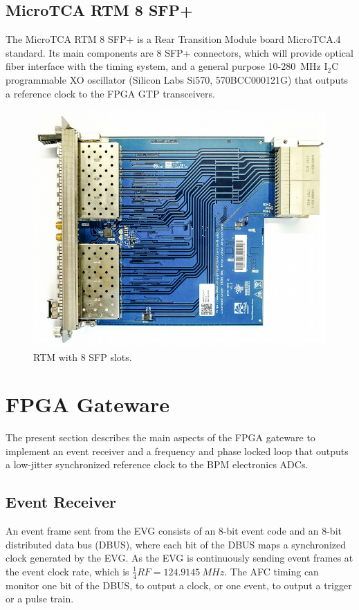 \documentclass[a4paper,
               biblatex,      %
               ]{jacow}
\begin{document}
\subsection{MicroTCA RTM 8 SFP+}
The MicroTCA RTM 8 SFP+ \cite{rtm-sfp-git} is a Rear Transition Module board MicroTCA.4 standard. Its main components are 8 SFP+ connectors, which will provide optical fiber interface with the timing system, and a general purpose 10-280~MHz I$_{2}$C programmable XO oscillator (Silicon Labs Si570, 570BCC000121G) that outputs a reference clock to the FPGA GTP transceivers. 

\begin{figure}[!htb]
   \centering
   \includegraphics*[width=0.8\columnwidth]{RTM_SFP_resized}
   \caption{RTM with 8 SFP slots.}
   \label{fig:rtm_sfp}
\end{figure}

\section{FPGA Gateware}

The present section describes the main aspects of the FPGA gateware to implement an event receiver and a frequency and phase locked loop that outputs a low-jitter synchronized reference clock to the BPM electronics ADCs.

\subsection{Event Receiver}

An event frame sent from the EVG consists of an 8-bit event code and an 8-bit distributed data bus (DBUS), where each bit of the DBUS maps a synchronized clock generated by the EVG.
As the EVG is continuously sending event frames at the event clock rate, which is $\frac{1}{4}RF=124.9145~MHz$. The AFC timing can monitor one bit of the DBUS, to output a clock, or one event, to output a trigger or a pulse train. 
\end{document}
